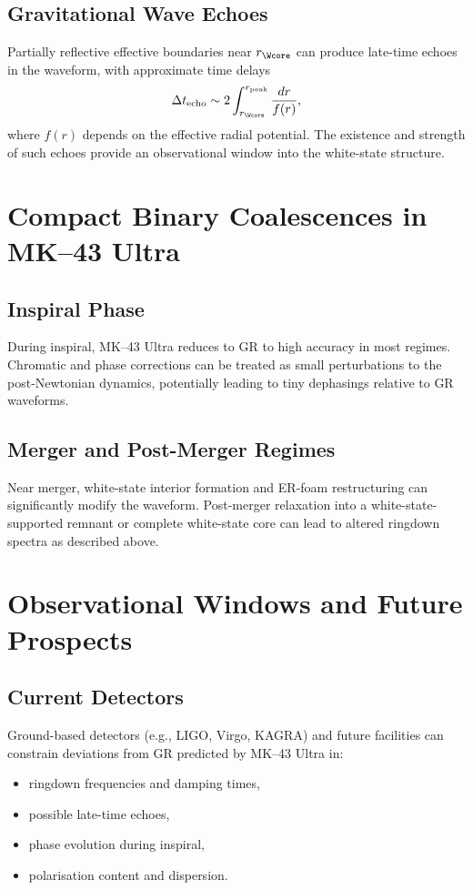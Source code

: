 \section{Gravitational Wave Echoes}

Partially reflective effective boundaries near $r_{\Wcore}$ can produce late-time echoes in the waveform, with approximate time delays
\[
\Delta t_{\mathrm{echo}} \sim 2\int_{r_{\Wcore}}^{r_{\mathrm{peak}}} \frac{dr}{f(r)},
\]
where $f(r)$ depends on the effective radial potential.
The existence and strength of such echoes provide an observational window into the white-state structure.

\chapter{Compact Binary Coalescences in MK--43 Ultra}

\section{Inspiral Phase}

During inspiral, MK--43 Ultra reduces to GR to high accuracy in most regimes.
Chromatic and phase corrections can be treated as small perturbations to the post-Newtonian dynamics, potentially leading to tiny dephasings relative to GR waveforms.

\section{Merger and Post-Merger Regimes}

Near merger, white-state interior formation and ER-foam restructuring can significantly modify the waveform.
Post-merger relaxation into a white-state-supported remnant or complete white-state core can lead to altered ringdown spectra as described above.

\chapter{Observational Windows and Future Prospects}

\section{Current Detectors}

Ground-based detectors (e.g., LIGO, Virgo, KAGRA) and future facilities can constrain deviations from GR predicted by MK--43 Ultra in:
\begin{itemize}
  \item ringdown frequencies and damping times,
  \item possible late-time echoes,
  \item phase evolution during inspiral,
  \item polarisation content and dispersion.
\end{itemize}

